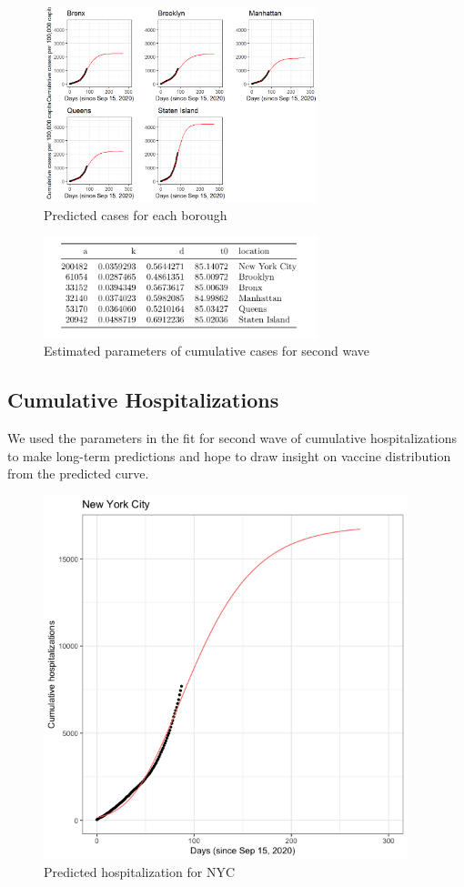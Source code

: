 \documentclass[
]{article}
\begin{document}
\begin{figure}
\centering
\includegraphics[width=3.125in,height=\textheight]{plots/case_plots/predictive/all_pred.png}
\caption{Predicted cases for each borough}
\end{figure}

\begin{figure}
\centering
\includegraphics[width=3.125in,height=\textheight]{plots/case_plots/predictive/case_final_parameters.png}
\caption{Estimated parameters of cumulative cases for second wave}
\end{figure}

\hypertarget{cumulative-hospitalizations-1}{%
\subsection{Cumulative
Hospitalizations}\label{cumulative-hospitalizations-1}}

We used the parameters in the fit for second wave of cumulative
hospitalizations to make long-term predictions and hope to draw insight
on vaccine distribution from the predicted curve.

\begin{figure}
\centering
\includegraphics[width=4.16667in,height=\textheight]{plots/hosp_plots/predictive/hosp_nyc_pred.png}
\caption{Predicted hospitalization for NYC}
\end{figure}
\end{document}
